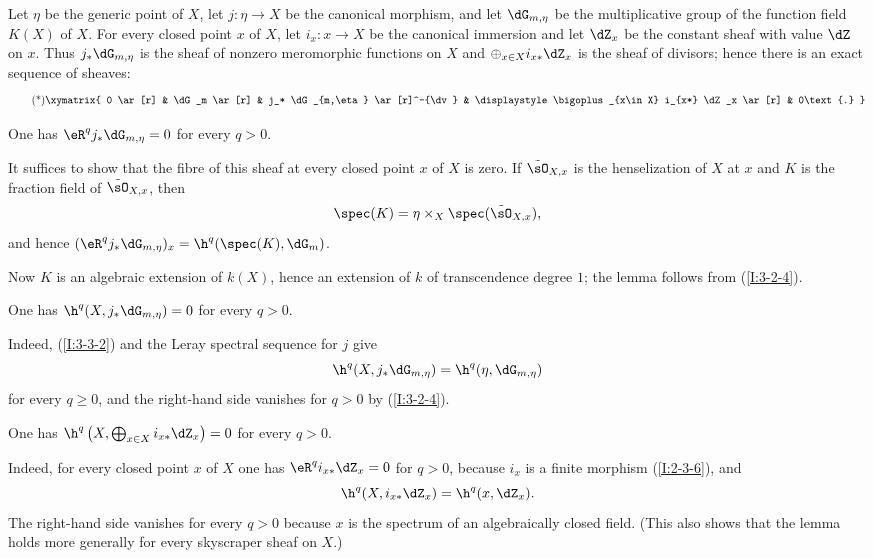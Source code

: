 Let $\eta$ be the generic point of $X$, let $j:\eta\to X$ be the
canonical morphism, and let $\dG_{m,\eta}$ be the multiplicative group of
the function field $K(X)$ of $X$. For every closed point $x$ of $X$, let
$i_x:x\to X$ be the canonical immersion and let $\dZ_x$ be the constant
sheaf with value $\dZ$ on $x$. Thus $j_*\dG_{m,\eta}$ is the sheaf of
nonzero meromorphic functions on $X$ and
$\oplus_{x\in X}i_{x*}\dZ_x$ is the sheaf of divisors; hence there is an
exact sequence of sheaves:
\begin{equation*}\tag{*}\label{I:eq:3-3-1-1}
\xymatrix{
  0 \ar[r]
    & \dG_m \ar[r]
    & j_* \dG_{m,\eta} \ar[r]^-{\dv}
    & \displaystyle\bigoplus_{x\in X} i_{x*} \dZ_x \ar[r]
    & 0\text{.}
}
\end{equation*}

\begin{lemma}\label{I:3-3-2}
One has $\eR^qj_*\dG_{m,\eta}=0$ for every $q>0$.
\end{lemma}

It suffices to show that the fibre of this sheaf at every closed point
$x$ of $X$ is zero. If $\tilde\sO_{X,x}$ is the henselization of $X$ at
$x$ and $K$ is the fraction field of $\tilde\sO_{X,x}$, then
\[
  \spec(K) = \eta\times_X \spec(\tilde\sO_{X,x})\text{,}
\]
and hence $(\eR^qj_*\dG_{m,\eta})_x=\h^q(\spec(K),\dG_m)$.

Now $K$ is an algebraic extension of $k(X)$, hence an extension of $k$
of transcendence degree $1$; the lemma follows from (\ref{I:3-2-4}).

\begin{lemma}\label{I:3-3-3}
One has $\h^q(X,j_*\dG_{m,\eta})=0$ for every $q>0$.
\end{lemma}

Indeed, (\ref{I:3-3-2}) and the Leray spectral sequence for $j$ give
\[
  \h^q(X, j_* \dG_{m,\eta}) = \h^q(\eta,\dG_{m,\eta})
\]
for every $q\geqslant0$, and the right-hand side vanishes for $q>0$ by
(\ref{I:3-2-4}).

\begin{lemma}\label{I:3-3-4}
One has
$\h^q\left(X,\bigoplus_{x\in X}i_{x*}\dZ_x\right)=0$ for every $q>0$.
\end{lemma}

Indeed, for every closed point $x$ of $X$ one has
$\eR^qi_{x*}\dZ_x=0$ for $q>0$, because $i_x$ is a finite morphism
(\ref{I:2-3-6}), and
\[
  \h^q(X,i_{x*}\dZ_x) = \h^q(x,\dZ_x)\text{.}
\]
The right-hand side vanishes for every $q>0$ because $x$ is the spectrum
of an algebraically closed field. (This also shows that the lemma holds
more generally for every skyscraper sheaf on $X$.)

